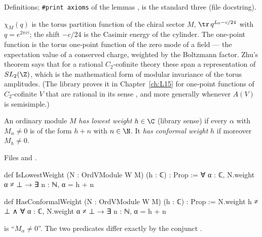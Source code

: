 \begin{status}
Definitions; \texttt{\#print axioms} of the lemmas ,  is the
standard three (file docstring).
\end{status}

\begin{physics}
$\chi_M(q)$ is the torus partition function of the chiral sector $M$, $\tr\,q^{L_0-c/24}$ with $q = e^{2\pi i\tau}$;
the shift $-c/24$ is the Casimir energy of the cylinder. The one-point function is the torus one-point
function of the zero mode of a field --- the expectation value of a conserved charge, weighted by the
Boltzmann factor. Zhu's theorem says that for a rational $C_2$-cofinite theory these span a representation of
$SL_2(\Z)$, which is the mathematical form of modular invariance of the torus amplitudes. (The library proves it in
Chapter~\ref{ch:L15} for one-point functions of $C_2$-cofinite $V$ that are rational in its sense
, and more generally whenever $A(V)$ is semisimple.)
\end{physics}

\begin{definition}\label{l12:def:lowest}
An ordinary module $M$ \emph{has lowest weight} $h\in\C$ (library sense) if every $\alpha$ with
$M_\alpha\neq0$ is of the form $h+n$ with $n\in\N$. It \emph{has conformal weight} $h$ if moreover
$M_h\neq0$.
\end{definition}
\noindent Files  and
.
\begin{leancode}
def IsLowestWeight (N : OrdVModule W M) (h : ℂ) : Prop :=
  ∀ α : ℂ, N.weight α ≠ ⊥ → ∃ n : ℕ, α = h + n

def HasConformalWeight (N : OrdVModule W M) (h : ℂ) : Prop :=
  N.weight h ≠ ⊥ ∧ ∀ α : ℂ, N.weight α ≠ ⊥ → ∃ n : ℕ, α = h + n
\end{leancode}

\begin{dictionary}
 is ``$M_\alpha\neq0$''. The two predicates differ exactly by the conjunct
.
\end{dictionary}

